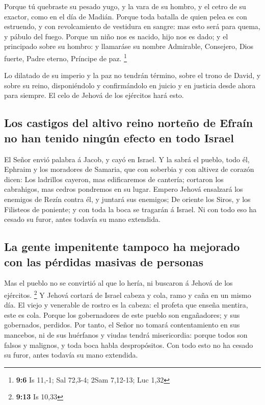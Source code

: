  Porque tú quebraste su pesado yugo, y la vara de su
hombro, y el cetro de su exactor, como en el día de Madián.
 Porque toda batalla de quien pelea es con estruendo, y
con revolcamiento de vestidura en sangre: mas esto será para quema, y
pábulo del fuego.  Porque un niño nos es nacido, hijo nos
es dado; y el principado sobre su hombro: y llamaráse su nombre
Admirable, Consejero, Dios fuerte, Padre eterno, Príncipe de paz.
\footnote{\textbf{9:6} Is 11,-1; Sal 72,3-4; 2Sam 7,12-13; Luc 1,32}

 Lo dilatado de su imperio y la paz no tendrán término,
sobre el trono de David, y sobre su reino, disponiéndolo y confirmándolo
en juicio y en justicia desde ahora para siempre. El celo de Jehová de
los ejércitos hará esto.

\hypertarget{los-castigos-del-altivo-reino-norteuxf1o-de-efrauxedn-no-han-tenido-ninguxfan-efecto-en-todo-israel}{%
\subsection{Los castigos del altivo reino norteño de Efraín no han
tenido ningún efecto en todo
Israel}\label{los-castigos-del-altivo-reino-norteuxf1o-de-efrauxedn-no-han-tenido-ninguxfan-efecto-en-todo-israel}}

 El Señor envió palabra á Jacob, y cayó en Israel.
 Y la sabrá el pueblo, todo él, Ephraim y los moradores de
Samaria, que con soberbia y con altivez de corazón dicen:
 Los ladrillos cayeron, mas edificaremos de cantería;
cortaron los cabrahigos, mas cedros pondremos en su lugar.
 Empero Jehová ensalzará los enemigos de Rezín contra él,
y juntará sus enemigos;  De oriente los Siros, y los
Filisteos de poniente; y con toda la boca se tragarán á Israel. Ni con
todo eso ha cesado su furor, antes todavía su mano extendida.

\hypertarget{la-gente-impenitente-tampoco-ha-mejorado-con-las-puxe9rdidas-masivas-de-personas}{%
\subsection{La gente impenitente tampoco ha mejorado con las pérdidas
masivas de
personas}\label{la-gente-impenitente-tampoco-ha-mejorado-con-las-puxe9rdidas-masivas-de-personas}}

 Mas el pueblo no se convirtió al que lo hería, ni
buscaron á Jehová de los ejércitos. \footnote{\textbf{9:13} Is 10,33}
 Y Jehová cortará de Israel cabeza y cola, ramo y caña en
un mismo día.  El viejo y venerable de rostro es la
cabeza: el profeta que enseña mentira, este es cola. 
Porque los gobernadores de este pueblo son engañadores; y sus
gobernados, perdidos.  Por tanto, el Señor no tomará
contentamiento en sus mancebos, ni de sus huérfanos y viudas tendrá
misericordia: porque todos son falsos y malignos, y toda boca habla
despropósitos. Con todo esto no ha cesado su furor, antes todavía su
mano extendida.

